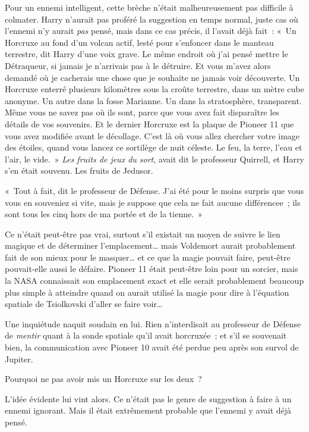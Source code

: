 Pour un ennemi intelligent, cette brèche n'était malheureusement pas difficile à colmater.
Harry n'aurait pas proféré la suggestion en temps normal, juste cas où l'ennemi n'y aurait \emph{pas} pensé, mais dans ce cas précis, il l'avait déjà fait~: «~Un Horcruxe au fond d'un volcan actif, lesté pour s'enfoncer dans le manteau terrestre, dit Harry d'une voix grave.
Le même endroit où j'ai pensé mettre le Détraqueur, si jamais je n'arrivais pas à le détruire.
Et vous m'avez alors demandé où je cacherais une chose que je souhaite ne jamais voir découverte.
Un Horcruxe enterré plusieurs kilomètres sous la croûte terrestre, dans un mètre cube anonyme.
Un autre dans la fosse Marianne.
Un dans la stratosphère, transparent.
Même vous ne savez pas où ils sont, parce que vous avez fait disparaître les détails de vos souvenirs.
Et le dernier Horcruxe est la plaque de Pioneer 11 que vous avez modifiée avant le décollage.
C'est là où vous allez chercher votre image des étoiles, quand vous lancez ce sortilège de nuit céleste.
Le feu, la terre, l'eau et l'air, le vide.~»
\emph{Les fruits de jeux du sort}, avait dit le professeur Quirrell, et Harry s'en était souvenu.
Les fruits de Jedusor.

«~Tout à fait, dit le professeur de Défense.
J'ai été pour le moins surpris que vous vous en souveniez si vite, mais je suppose que cela ne fait aucune différencee~; ils sont tous les cinq hors de ma portée et de la tienne.~»

Ce n'était peut-être pas vrai, surtout s'il existait un moyen de suivre le lien magique et de déterminer l'emplacement… mais Voldemort aurait probablement fait de son mieux pour le masquer… et ce que la magie pouvait faire, peut-être pouvait-elle aussi le défaire.
Pioneer 11 était peut-être loin pour un sorcier, mais la NASA connaissait son emplacement exact et elle serait probablement beaucoup plus simple à atteindre quand on aurait utilisé la magie pour dire à l'équation spatiale de Tsiolkovski d'aller se faire voir…

Une inquiétude naquit soudain en lui.
Rien n'interdisait au professeur de Défense de \emph{mentir} quant à la sonde spatiale qu'il avait horcruxée~; et s'il se souvenait bien, la communication avec Pioneer 10 avait été perdue peu après son survol de Jupiter.

Pourquoi ne pas avoir mis un Horcruxe sur les deux~?

L'idée évidente lui vint alors.
Ce n'était pas le genre de suggestion à faire à un ennemi ignorant.
Mais il était extrêmement probable que l'ennemi y avait déjà pensé.

